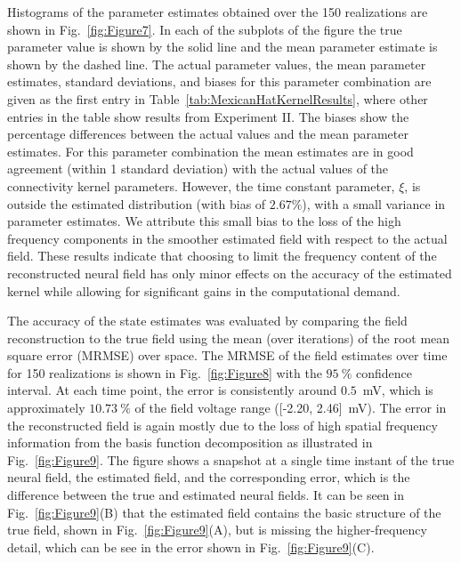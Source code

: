 \documentclass[review,authoryear,3p]{elsarticle}
\begin{document}
Histograms of the parameter estimates obtained over the 150 realizations are shown in Fig.~\ref{fig:Figure7}. In each of the subplots of the figure the true parameter value is shown by the solid line and the mean parameter estimate is shown by the dashed line. The actual parameter values, the mean parameter estimates, standard deviations, and biases for this parameter combination are given as the first entry in Table~\ref{tab:MexicanHatKernelResults}, where other entries in the table show results from Experiment II. The biases show the percentage differences between the actual values and the mean parameter estimates. For this parameter combination the mean estimates are in good agreement (within 1 standard deviation) with the actual values of the connectivity kernel parameters. However, the time constant parameter, $\xi$, is outside the estimated distribution (with bias of $2.67\%$), with a small variance in parameter estimates. We attribute this small bias to the loss of the high frequency components in the smoother estimated field with respect to the actual field. These results indicate that choosing to limit the frequency content of the reconstructed neural field has only minor effects on the accuracy of the estimated kernel while allowing for significant gains in the computational demand.

The accuracy of the state estimates was evaluated by comparing the field reconstruction to the true field using the mean (over iterations) of the root mean square error (MRMSE) over space. The MRMSE of the field estimates over time for 150 realizations is shown in Fig.~\ref{fig:Figure8} with the $95~\%$ confidence interval. At each time point, the error is consistently around $0.5$~mV, which is approximately $10.73~\%$ of the field voltage range ([-2.20, 2.46]~mV). The error in the reconstructed field is again mostly due to the loss of high spatial frequency information from the basis function decomposition as illustrated in Fig.~\ref{fig:Figure9}. The figure shows a snapshot at a single time instant of the true neural field, the estimated field, and the corresponding error, which is the difference between the true and estimated neural fields. It can be seen in Fig.~\ref{fig:Figure9}(B) that the estimated field contains the basic structure of the true field, shown in Fig.~\ref{fig:Figure9}(A), but is missing the higher-frequency detail, which can be see in the error shown in Fig.~\ref{fig:Figure9}(C).
\end{document}

